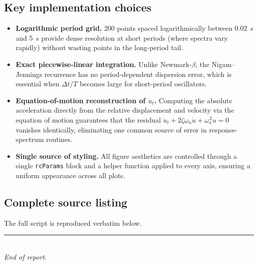 \documentclass[11pt,a4paper]{article}
\begin{document}
\subsection{Key implementation choices}
\begin{itemize}[leftmargin=1.4em,itemsep=0.2em]
  \item \textbf{Logarithmic period grid.} 200 points spaced
        logarithmically between \SI{0.02}{s} and \SI{5}{s} provide
        dense resolution at short periods (where spectra vary
        rapidly) without wasting points in the long-period tail.
  \item \textbf{Exact piecewise-linear integration.} Unlike
        Newmark-$\beta$, the Nigam--Jennings recurrence has no
        period-dependent dispersion error, which is essential when
        $\Delta t / T$ becomes large for short-period oscillators.
  \item \textbf{Equation-of-motion reconstruction of $\ddot{u}_t$.}
        Computing the absolute acceleration directly from the
        relative displacement and velocity via the equation of motion
        guarantees that the residual
        $\ddot{u}_t + 2\zeta\omega_n\dot{u} + \omega_n^{\,2} u = 0$
        vanishes identically, eliminating one common source of error
        in response-spectrum routines.
  \item \textbf{Single source of styling.} All figure aesthetics are
        controlled through a single \texttt{rcParams} block and a
        helper function applied to every axis, ensuring a uniform
        appearance across all plots.
\end{itemize}

\subsection{Complete source listing}
The full script is reproduced verbatim below.



\vspace{1em}
{\color{rule}\rule{\linewidth}{0.4pt}}\\
{\small \emph{End of report.}}
\end{document}
